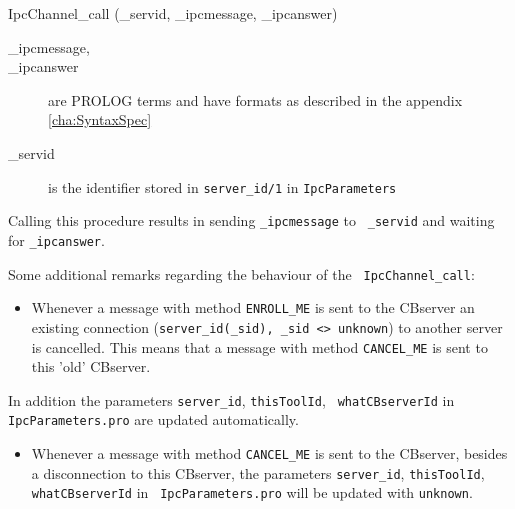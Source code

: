 \begin{method}{IpcChannel\_call (\_servid, \_ipcmessage, \_ipcanswer)}
  \begin{description}
  \item[\_ipcmessage,]
  \item[\_ipcanswer] are PROLOG terms and have formats as 
  	described in the appendix \ref{cha:SyntaxSpec}
  \item[\_servid] is the identifier stored in {\tt server\_id/1}
    in {\tt IpcParameters} 
  \end{description}

  Calling this procedure results in sending {\tt \_ipcmessage} to {\tt
    \_servid} and waiting for {\tt \_ipcanswer}.


  Some additional remarks regarding the behaviour of the {\tt
    IpcChannel\_call}: 

  \begin{itemize}
  \item Whenever a message with method {\tt ENROLL\_ME} is sent to the
    CBserver an existing connection ({\tt server\_id(\_sid), \_sid <>
      unknown}) to another server is cancelled. This means that a
    message with method {\tt CANCEL\_ME} is sent to this 'old'
    CBserver.
  \end{itemize}

  In addition the parameters {\tt server\_id}, {\tt thisToolId}, {\tt
    whatCBserverId} in {\tt IpcParameters.pro} are updated
  automatically.

  \begin{itemize}
  \item Whenever a message with method {\tt CANCEL\_ME} is sent to the
    CBserver, besides a disconnection to this CBserver, the parameters
    {\tt server\_id}, {\tt thisToolId}, {\tt whatCBserverId} in {\tt
      IpcParameters.pro} will be updated with {\tt unknown}.
  \end{itemize}
\end{method}

